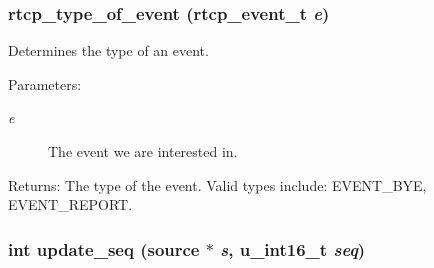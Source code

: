 \subsubsection{ rtcp\_\-type\_\-of\_\-event ({\bf rtcp\_\-event\_\-t} {\em e})\hspace{0.3cm}{\tt  [static]}}\label{rtcp_8c_a20}


Determines the type of an event. \begin{Desc}
\item[Parameters:]
\begin{description}
\item[{\em e}]The event we are interested in. \end{description}
\end{Desc}
\begin{Desc}
\item[Returns:]The type of the event. Valid types include: EVENT\_\-BYE, EVENT\_\-REPORT. \end{Desc}
\subsubsection{\setlength{\rightskip}{0pt plus 5cm}int update\_\-seq ({\bf source} $\ast$ {\em s}, u\_\-int16\_\-t {\em seq})\hspace{0.3cm}{\tt  [static]}}\label{rtcp_8c_a14}


